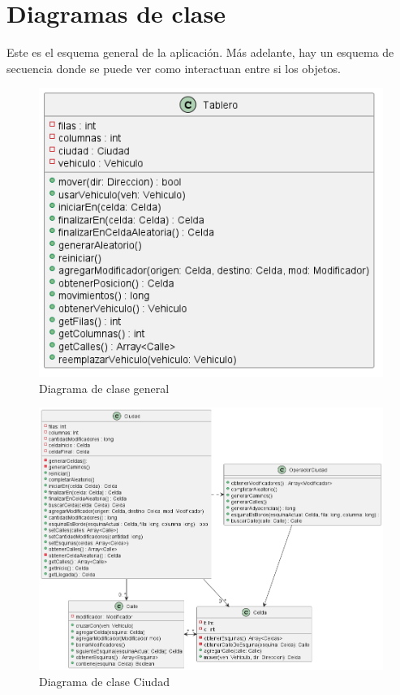 \documentclass[titlepage,a4paper]{article}
\begin{document}
\section{Diagramas de clase}\label{sec:diagramasdeclase}

Este es el esquema general de la aplicación. Más adelante, hay un esquema de secuencia donde se puede ver como interactuan entre si los objetos.


\begin{figure}[H]
  \centering
  \includegraphics[width=1\textwidth]{diagramas/modelo-actual.png}
  \caption{\label{fig:seq01} Diagrama de clase general}
\end{figure}

\begin{figure}[H]
  \centering
  \includegraphics[width=1\textwidth]{diagramas/diagrama-ciudad.png}
  \caption{\label{fig:seq02} Diagrama de clase Ciudad}
\end{figure}
\end{document}

